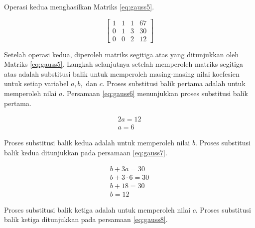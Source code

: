 Operasi kedua menghasilkan Matriks \ref{eq:gauss5}.

\begin{center}
	\setlength\arraycolsep{10pt}
	\begin{equation}
		\begin{bmatrix}
				1 	& 1 	& 1 	& 67 		\\[1em]
				0 	& 1 	& 3 	& 30 		\\[1em]
				0 	& 0 	& 2 	& 12
		\end{bmatrix}
		\label{eq:gauss5}
	\end{equation}
\end{center}

Setelah operasi kedua, diperoleh matriks segitiga atas yang ditunjukkan oleh Matriks \ref{eq:gauss5}. Langkah selanjutnya setelah memperoleh matriks segitiga atas adalah substitusi balik untuk memperoleh masing-masing nilai koefesien untuk setiap variabel \begin{math}a, b,\end{math} dan \begin{math}c\end{math}. Proses substitusi balik pertama adalah untuk memperoleh nilai \begin{math}a\end{math}. Persamaan \ref{eq:gauss6} menunjukkan proses substitusi balik pertama.

\begin{align}
	2a = 12 \nonumber \\
	a = 6 \label{eq:gauss6}
\end{align}

Proses substitusi balik kedua adalah untuk memperoleh nilai \begin{math}b\end{math}. Proses substitusi balik kedua ditunjukkan pada persamaan \ref{eq:gauss7}.

\begin{align}
	b + 3a = 30 \nonumber \\
	b + 3\cdot6 = 30 \nonumber \\
	b + 18 = 30 \nonumber \\
	b = 12 \label{eq:gauss7}
\end{align}

Proses substitusi balik ketiga adalah untuk memperoleh nilai \begin{math}c\end{math}. Proses substitusi balik ketiga ditunjukkan pada persamaan \ref{eq:gauss8}.

